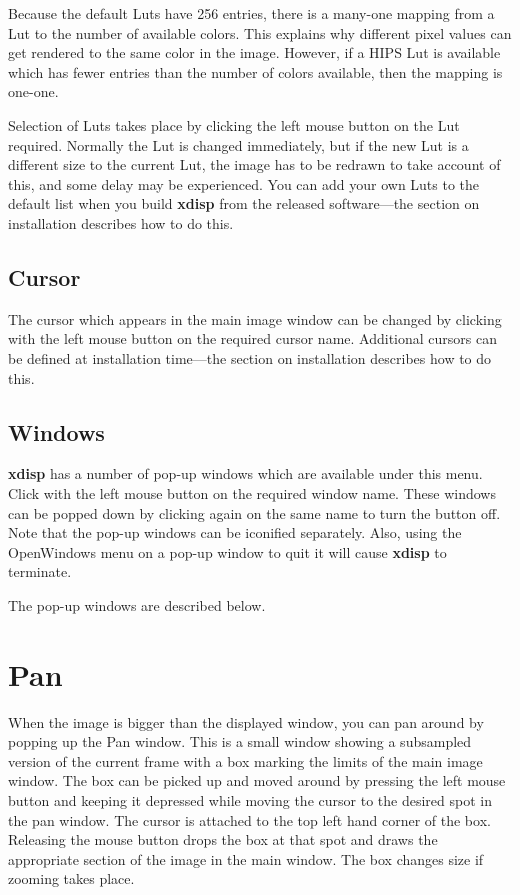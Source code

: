 Because the default Luts have 256 entries, there is a many-one mapping from a Lut to the number of available colors. This explains why different pixel values can get rendered to the same color in the image. However, if a HIPS Lut is available which has fewer entries than the number of colors available, then the mapping is one-one.

Selection of Luts takes place by clicking the left mouse button on the Lut required. Normally the Lut is changed immediately, but if the new Lut is a different size to the current Lut, the image has to be redrawn to take account of this, and some delay may be experienced. You can add your own Luts to the default list when you build {\bf xdisp} from the released software---the section on installation describes how to do this.

\subsection{Cursor}
The cursor which appears in the main image window can be changed by clicking with the left mouse button on the required cursor name. Additional cursors can be defined at installation time---the section on installation describes how to do this.

\subsection{Windows}
{\bf xdisp} has a number of pop-up windows which are available under this menu. Click with the left mouse button on the required window name. These windows can be popped down by clicking again on the same name to turn the button off. Note that the pop-up windows can be iconified separately. Also, using the OpenWindows menu on a pop-up window to quit it will cause {\bf xdisp} to terminate.

The pop-up windows are described below.

\section{Pan}
When the image is bigger than the displayed window, you can pan around by popping up the Pan window. This is a small window showing a subsampled version of the current frame with a box marking the limits of the main image window. The box can be picked up and moved around by pressing the left mouse button and keeping it depressed while moving the cursor to the desired spot in the pan window. The cursor is attached to the top left hand corner of the box. Releasing the mouse button drops the box at that spot and draws the appropriate section of the image in the main window. The box changes size if zooming takes place.

